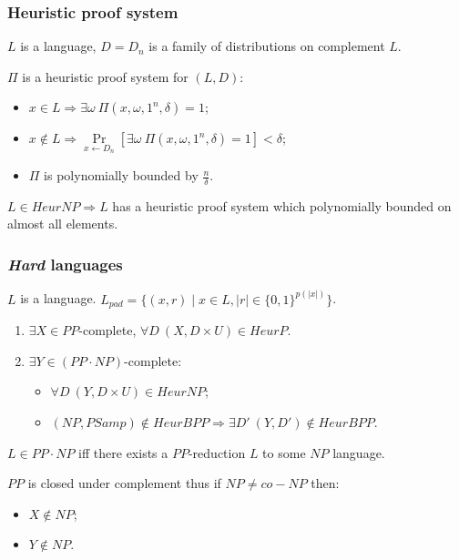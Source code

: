 \begin{frame}
    \frametitle{Heuristic proof system}

    $L$ is a language, $D = {D_n}$ is a family of distributions on
    complement $L$.

    \pause
    \begin{definition}
        $\Pi$ is a heuristic proof system for $(L, D)$:
        \begin{itemize}
            \item $x \in L \Rightarrow \exists \omega~\Pi(x, \omega,
        		1^n, \delta) = 1$;
            \item $x \notin L \Rightarrow
        		\Pr\limits_{x \gets D_n}[\exists \omega~
                \Pi(x, \omega, 1^n, \delta) = 1] < \delta$;
             \item $\Pi$ is polynomially bounded by $\frac{n}{\delta}$.
        \end{itemize}
    \end{definition}

    $L \in HeurNP \Rightarrow L$ has a heuristic proof system which polynomially
    bounded on {\color{blue} almost all} elements.
\end{frame}


\begin{frame}
    \frametitle{\textit{Hard} languages}

    $L$ is a language.
    $L_{pad} = \{(x, r) \mid x \in L, |r| \in \{0, 1 \}^{p(|x|)}\}$.

    \begin{theorem}
        \begin{enumerate}
            \item $\exists X \in PP$-complete, $\forall D~
	    		(X, D \times U) \in HeurP$.
    		\pause
    		\item $\exists Y \in (PP \cdot NP)$-complete:
		        \begin{itemize}
        	        \item $\forall D~ (Y, D \times U) \in HeurNP$;
                	\item $(NP, PSamp) \notin HeurBPP \Rightarrow \exists D'~ (Y, D')
                		\notin HeurBPP$.
		        \end{itemize}
        		
        \end{enumerate}
    \end{theorem}

    $L \in PP \cdot NP$ iff there exists a $PP$-reduction $L$ to some $NP$ language.
    
    \pause

    \vspace{0.5cm}
    $PP$ is closed under complement thus if $NP \neq co-NP$ then:
    \begin{itemize}
    	\item $X \notin NP$;
    	\item $Y \notin NP$.
    \end{itemize}
 
\end{frame}




